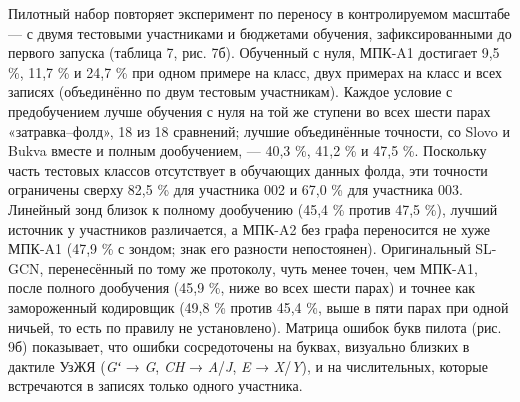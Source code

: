 Пилотный набор повторяет эксперимент по переносу в контролируемом масштабе --- с двумя тестовыми участниками и бюджетами обучения, зафиксированными до первого запуска (таблица 7, рис. 7б). Обученный с нуля, МПК-A1 достигает 9,5 \%, 11,7 \% и 24,7 \% при одном примере на класс, двух примерах на класс и всех записях (объединённо по двум тестовым участникам). Каждое условие с предобучением лучше обучения с нуля на той же ступени во всех шести парах «затравка--фолд», 18 из 18 сравнений; лучшие объединённые точности, со Slovo и Bukva вместе и полным дообучением, --- 40,3 \%, 41,2 \% и 47,5 \%. Поскольку часть тестовых классов отсутствует в обучающих данных фолда, эти точности ограничены сверху 82,5 \% для участника 002 и 67,0 \% для участника 003. Линейный зонд близок к полному дообучению (45,4 \% против 47,5 \%), лучший источник у участников различается, а МПК-A2 без графа переносится не хуже МПК-A1 (47,9 \% с зондом; знак его разности непостоянен). Оригинальный SL-GCN, перенесённый по тому же протоколу, чуть менее точен, чем МПК-A1, после полного дообучения (45,9 \%, ниже во всех шести парах) и точнее как замороженный кодировщик (49,8 \% против 45,4 \%, выше в пяти парах при одной ничьей, то есть по правилу не установлено). Матрица ошибок букв пилота (рис. 9б) показывает, что ошибки сосредоточены на буквах, визуально близких в дактиле УзЖЯ (\emph{Gʻ} → \emph{G}, \emph{CH} → \emph{A}/\emph{J}, \emph{E} → \emph{X}/\emph{Y}), и на числительных, которые встречаются в записях только одного участника.

